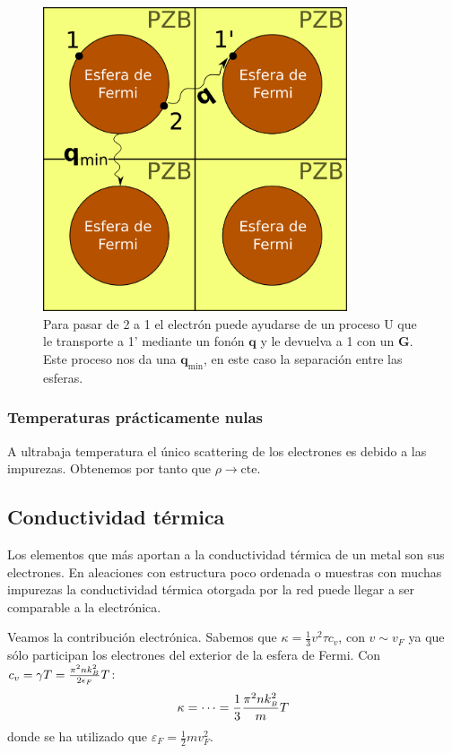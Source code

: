 \begin{figure}
  \centering
  \includegraphics[width=0.8\textwidth]{figures/encaje.png}
  \caption{Para pasar de 2 a 1 el electrón puede ayudarse de un
    proceso U que le transporte  a 1' mediante un fonón $\mathbf{q}$ y le
    devuelva a 1 con un $\mathbf{G}$. Este proceso nos da una
    $\mathbf{q}_\text{min}$, en este caso la separación entre las esferas.}
  \label{fig:encaje}
\end{figure}

\subsubsection{Temperaturas prácticamente nulas}
A ultrabaja temperatura el único scattering de los electrones es
debido a las impurezas. Obtenemos por tanto que $\rho \to \text{cte.}$




\subsection{Conductividad térmica}
Los elementos que más aportan a la conductividad térmica de un metal
son sus electrones. En aleaciones con estructura poco ordenada o
muestras con muchas impurezas la conductividad térmica otorgada por la
red puede llegar a ser comparable a la electrónica.

Veamos la contribución electrónica.
Sabemos que $\kappa = \frac{1}{3} v^2 \tau c_v$, con $v \sim
v_{\scriptscriptstyle F}$ ya que sólo participan
los electrones del exterior de la esfera de Fermi. Con
$c_v = \gamma T = \frac{\pi^2 n k_{\scriptscriptstyle{B}} ^2}{2 \epsilon_{\scriptscriptstyle
  F}} T$:
\begin{equation}
  \kappa = \cdots = \frac{1}{3} \frac{\pi^2 n k_{\scriptscriptstyle{B}} ^2}{m} T
\end{equation}
donde se ha utilizado que $\varepsilon_{\scriptscriptstyle F} =
\frac{1}{2}m v_{\scriptscriptstyle F}^2$.

